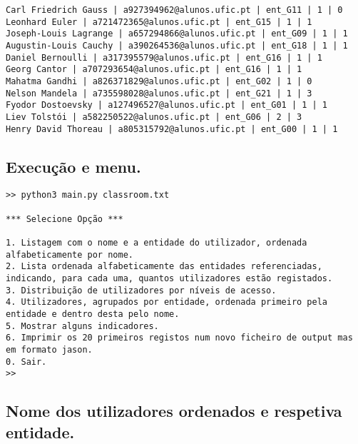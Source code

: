 \documentclass[11pt,a4paper]{report}%
\begin{document}
\begin{verbatim}
Carl Friedrich Gauss | a927394962@alunos.ufic.pt | ent_G11 | 1 | 0
Leonhard Euler | a721472365@alunos.ufic.pt | ent_G15 | 1 | 1
Joseph-Louis Lagrange | a657294866@alunos.ufic.pt | ent_G09 | 1 | 1
Augustin-Louis Cauchy | a390264536@alunos.ufic.pt | ent_G18 | 1 | 1
Daniel Bernoulli | a317395579@alunos.ufic.pt | ent_G16 | 1 | 1
Georg Cantor | a707293654@alunos.ufic.pt | ent_G16 | 1 | 1
Mahatma Gandhi | a826371829@alunos.ufic.pt | ent_G02 | 1 | 0
Nelson Mandela | a735598028@alunos.ufic.pt | ent_G21 | 1 | 3
Fyodor Dostoevsky | a127496527@alunos.ufic.pt | ent_G01 | 1 | 1
Liev Tolstói | a582250522@alunos.ufic.pt | ent_G06 | 2 | 3
Henry David Thoreau | a805315792@alunos.ufic.pt | ent_G00 | 1 | 1
\end{verbatim}


\subsection{Execução e menu.}
\begin{scriptsize}
\begin{verbatim}
>> python3 main.py classroom.txt

*** Selecione Opção ***

1. Listagem com o nome e a entidade do utilizador, ordenada alfabeticamente por nome.
2. Lista ordenada alfabeticamente das entidades referenciadas, indicando, para cada uma, quantos utilizadores estão registados.
3. Distribuição de utilizadores por níveis de acesso.
4. Utilizadores, agrupados por entidade, ordenada primeiro pela entidade e dentro desta pelo nome.
5. Mostrar alguns indicadores.
6. Imprimir os 20 primeiros registos num novo ficheiro de output mas em formato jason.
0. Sair.
>> 
\end{verbatim}
\end{scriptsize}

\subsection{Nome dos utilizadores ordenados e respetiva entidade.}
\end{document}
